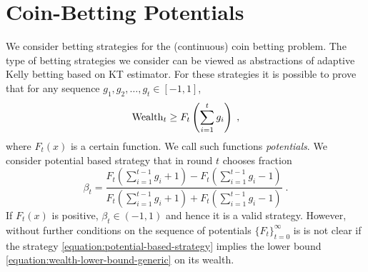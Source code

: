 \section{Coin-Betting Potentials}
\label{section:coin-betting-potentials}

We consider betting strategies for the (continuous) coin betting problem. The
type of betting strategies we consider can be viewed as abstractions of
adaptive Kelly betting based on KT estimator. For these strategies it is
possible to prove that for any sequence $g_1, g_2, \dots, g_t \in [-1,1]$,
\begin{equation}
\label{equation:wealth-lower-bound-generic}
\operatorname{Wealth}_t \ge F_t \left( \sum_{i=1}^t g_i \right) \; ,
\end{equation}
where $F_t(x)$ is a certain function. We call such functions \emph{potentials}.
We consider potential based strategy that in round $t$ chooses fraction
\begin{equation}
\label{equation:potential-based-strategy}
\beta_t = \frac{F_t(\sum_{i=1}^{t-1} g_i + 1) - F_t(\sum_{i=1}^{t-1} g_i - 1)}{F_t(\sum_{i=1}^{t-1} g_i + 1) + F_t(\sum_{i=1}^{t-1} g_i - 1)} \; .
\end{equation}
If $F_t(x)$ is positive, $\beta_t \in (-1,1)$ and hence it is a valid
strategy. However, without further conditions on the sequence of potentials
$\{F_t\}_{t=0}^\infty$ is is not clear if the strategy
\eqref{equation:potential-based-strategy} implies the lower bound
\eqref{equation:wealth-lower-bound-generic} on its wealth.

